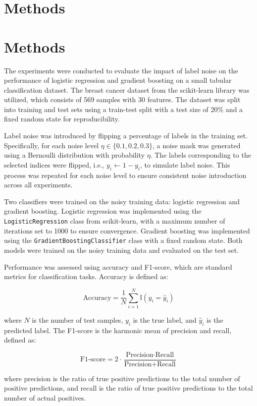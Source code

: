 \documentclass{article}
\begin{document}
\section{Methods}
\section{Methods}

The experiments were conducted to evaluate the impact of label noise on the performance of logistic regression and gradient boosting on a small tabular classification dataset. The breast cancer dataset from the scikit-learn library was utilized, which consists of 569 samples with 30 features. The dataset was split into training and test sets using a train-test split with a test size of 20\% and a fixed random state for reproducibility.

Label noise was introduced by flipping a percentage of labels in the training set. Specifically, for each noise level $\eta \in \{0.1, 0.2, 0.3\}$, a noise mask was generated using a Bernoulli distribution with probability $\eta$. The labels corresponding to the selected indices were flipped, i.e., $y_i \leftarrow 1 - y_i$, to simulate label noise. This process was repeated for each noise level to ensure consistent noise introduction across all experiments.

Two classifiers were trained on the noisy training data: logistic regression and gradient boosting. Logistic regression was implemented using the \texttt{LogisticRegression} class from scikit-learn, with a maximum number of iterations set to 1000 to ensure convergence. Gradient boosting was implemented using the \texttt{GradientBoostingClassifier} class with a fixed random state. Both models were trained on the noisy training data and evaluated on the test set.

Performance was assessed using accuracy and F1-score, which are standard metrics for classification tasks. Accuracy is defined as:

$$
\text{Accuracy} = \frac{1}{N} \sum_{i=1}^{N} \mathbb{I}(y_i = \hat{y}_i)
$$

where $N$ is the number of test samples, $y_i$ is the true label, and $\hat{y}_i$ is the predicted label. The F1-score is the harmonic mean of precision and recall, defined as:

$$
\text{F1-score} = 2 \cdot \frac{\text{Precision} \cdot \text{Recall}}{\text{Precision} + \text{Recall}}
$$

where precision is the ratio of true positive predictions to the total number of positive predictions, and recall is the ratio of true positive predictions to the total number of actual positives.
\end{document}
